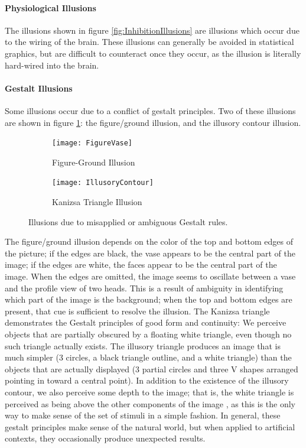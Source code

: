 \documentclass[11pt]{isuthesis}\usepackage[]{graphicx}\usepackage[]{color}
\begin{document}
\paragraph{Physiological Illusions} The illusions shown in figure \ref{fig:InhibitionIllusions} are illusions which occur due to the wiring of the brain. These illusions can generally be avoided in statistical graphics, but are difficult to counteract once they occur, as the illusion is literally hard-wired into the brain. 

\paragraph{Gestalt Illusions} Some illusions occur due to a conflict of gestalt principles. Two of these illusions are shown in figure \ref{fig:GestaltIllusions}: the figure/ground illusion, and the illusory contour illusion. 

\begin{figure}[htbp]\centering
\hfil
\begin{subfigure}[b]{.4\textwidth}\centering\vspace{.5cm}
  \texttt{[image: FigureVase]}\vspace{1cm}
  \caption{Figure-Ground Illusion}
\end{subfigure}\hfill
\begin{subfigure}[b]{.4\textwidth}\centering
  \texttt{[image: IllusoryContour]}
  \caption{Kanizsa Triangle Illusion}
\end{subfigure}\hfil
\caption[Gestalt Illusions]{Illusions due to misapplied or ambiguous Gestalt rules.}\label{fig:GestaltIllusions}
\end{figure}

The figure/ground illusion depends on the color of the top and bottom edges of the picture; if the edges are black, the vase appears to be the central part of the image; if the edges are white, the faces appear to be the central part of the image. When the edges are omitted, the image seems to oscillate between a vase and the profile view of two heads. This is a result of ambiguity in identifying which part of the image is the background; when the top and bottom edges are present, that cue is sufficient to resolve the illusion. The Kanizsa triangle demonstrates the Gestalt principles of good form and continuity: We perceive objects that are partially obscured by a floating white triangle, even though no such triangle actually exists. The illusory triangle produces an image that is much simpler (3 circles, a black triangle outline, and a white triangle) than the objects that are actually displayed (3 partial circles and three V shapes arranged pointing in toward a central point). In addition to the existence of the illusory contour, we also perceive some depth to the image; that is, the white triangle is perceived as being above the other components of the image \citep{coren1983subjective}, as this is the only way to make sense of the set of stimuli in a simple fashion. In general, these gestalt principles make sense of the natural world, but when applied to artificial contexts, they occasionally produce unexpected results. 
\end{document}
